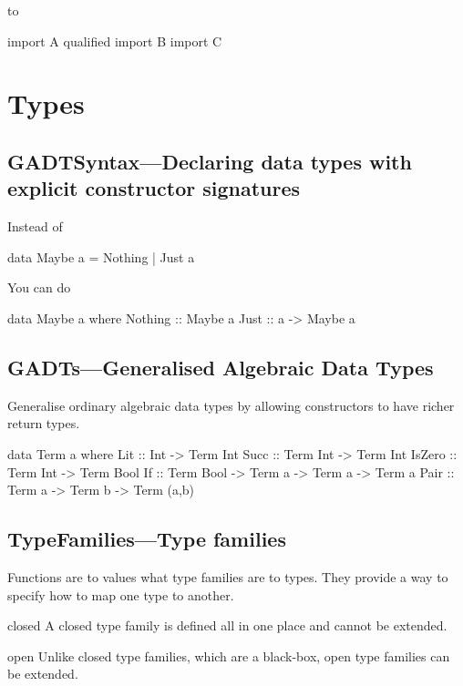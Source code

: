\documentclass[openany, 12pt]{book}
\begin{document}
to
\begin{haskell}{}
import A qualified
import B
import C
\end{haskell}


\part{Types}


\setcounter{chapter}{7}
\chapter{GADTSyntax---Declaring data types with explicit constructor signatures}
Instead of
\begin{haskell}{}
data Maybe a = Nothing | Just a
\end{haskell}

You can do
\begin{haskell}{}
data Maybe a where
    Nothing :: Maybe a
    Just    :: a -> Maybe a
\end{haskell}

\chapter{GADTs---Generalised Algebraic Data Types}
Generalise ordinary algebraic data types by allowing constructors to have richer
return types.

\begin{haskell}{}
data Term a where
    Lit    :: Int -> Term Int
    Succ   :: Term Int -> Term Int
    IsZero :: Term Int -> Term Bool
    If     :: Term Bool -> Term a -> Term a -> Term a
    Pair   :: Term a -> Term b -> Term (a,b)
\end{haskell}


\setcounter{chapter}{9}
\chapter{TypeFamilies---Type families}
Functions are to values what type families are to types. They provide a way to
specify how to map one type to another.

\begin{definition}{closed}{}
	A closed type family is defined all in one place and cannot be extended.
\end{definition}

\begin{definition}{open}{}
	Unlike closed type families, which are a black-box, open type families can be extended.
\end{definition}
\end{document}
